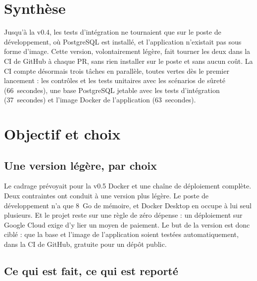 \documentclass[11pt,a4paper]{article}
\begin{document}

\section*{Synthèse}

Jusqu'à la v0.4, les tests d'intégration ne tournaient que sur le poste de développement, où PostgreSQL est installé, et l'application n'existait pas sous forme d'image. Cette version, volontairement légère, fait tourner les deux dans la CI de GitHub à chaque PR, sans rien installer sur le poste et sans aucun coût. La CI compte désormais trois tâches en parallèle, toutes vertes dès le premier lancement : les contrôles et les tests unitaires avec les scénarios de sûreté (66~secondes), une base PostgreSQL jetable avec les tests d'intégration (37~secondes) et l'image Docker de l'application (63~secondes).

\setcounter{tocdepth}{1}
\tableofcontents
\newpage

\section{Objectif et choix}

\subsection{Une version légère, par choix}

Le cadrage prévoyait pour la v0.5 Docker et une chaîne de déploiement complète. Deux contraintes ont conduit à une version plus légère. Le poste de développement n'a que 8~Go de mémoire, et Docker Desktop en occupe à lui seul plusieurs. Et le projet reste sur une règle de zéro dépense : un déploiement sur Google Cloud exige d'y lier un moyen de paiement. Le but de la version est donc ciblé : que la base et l'image de l'application soient testées automatiquement, dans la CI de GitHub, gratuite pour un dépôt public.

\subsection{Ce qui est fait, ce qui est reporté}
\end{document}
